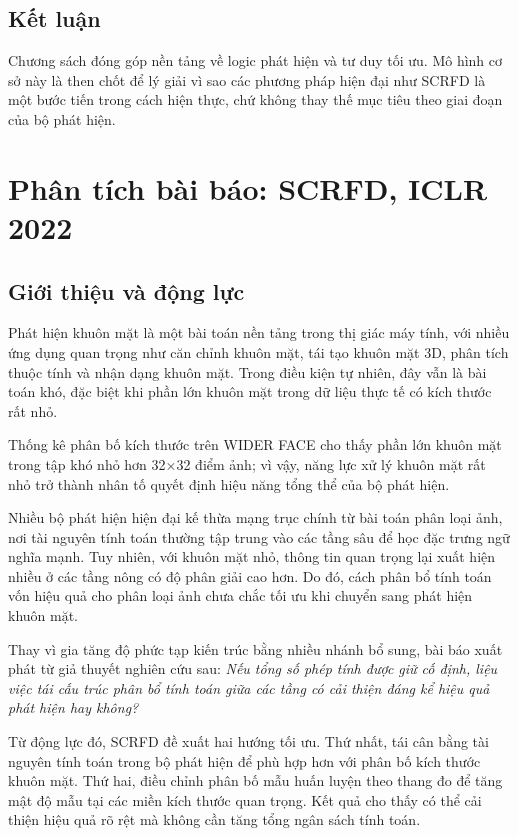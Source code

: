 \section{Kết luận}

Chương sách đóng góp nền tảng về logic phát hiện và tư duy tối ưu.
Mô hình cơ sở này là then chốt để lý giải vì sao các phương pháp hiện đại như SCRFD
là một bước tiến trong cách hiện thực, chứ không thay thế mục tiêu theo giai đoạn của bộ phát hiện.

\chapter{Phân tích bài báo: SCRFD, ICLR 2022}

\section{Giới thiệu và động lực}

Phát hiện khuôn mặt là một bài toán nền tảng trong thị giác máy tính, với nhiều
ứng dụng quan trọng như căn chỉnh khuôn mặt, tái tạo khuôn mặt 3D, phân tích thuộc tính và nhận dạng khuôn mặt.
Trong điều kiện tự nhiên, đây vẫn là bài toán khó, đặc biệt khi phần lớn khuôn mặt trong dữ liệu thực tế có kích thước rất nhỏ.

Thống kê phân bố kích thước trên WIDER FACE cho thấy phần lớn khuôn mặt trong tập khó nhỏ hơn 32×32 điểm ảnh; vì vậy,
năng lực xử lý khuôn mặt rất nhỏ trở thành nhân tố quyết định hiệu năng tổng thể của bộ phát hiện.  \cite{guo2022scrfd,yang2016widerface}

Nhiều bộ phát hiện hiện đại kế thừa mạng trục chính từ bài toán phân loại ảnh, nơi tài nguyên tính toán thường tập trung vào các tầng sâu để học
đặc trưng ngữ nghĩa mạnh. Tuy nhiên, với khuôn mặt nhỏ, thông tin quan trọng lại xuất hiện nhiều ở các tầng nông có độ phân giải cao hơn.
Do đó, cách phân bổ tính toán vốn hiệu quả cho phân loại ảnh chưa chắc tối ưu khi chuyển sang phát hiện khuôn mặt.  \cite{guo2022scrfd}

Thay vì gia tăng độ phức tạp kiến trúc bằng nhiều nhánh bổ sung, bài báo xuất phát từ giả thuyết nghiên cứu sau:
\textit{Nếu tổng số phép tính được giữ cố định, liệu việc tái cấu trúc phân bổ tính toán giữa các tầng có cải thiện đáng kể hiệu quả phát hiện hay không?}

Từ động lực đó, SCRFD đề xuất hai hướng tối ưu.
Thứ nhất, tái cân bằng tài nguyên tính toán trong bộ phát hiện để phù hợp hơn với phân bố kích thước khuôn mặt.
Thứ hai, điều chỉnh phân bố mẫu huấn luyện theo thang đo để tăng mật độ mẫu tại các miền kích thước quan trọng.
Kết quả cho thấy có thể cải thiện hiệu quả rõ rệt mà không cần tăng tổng ngân sách tính toán.  \cite{guo2022scrfd}

